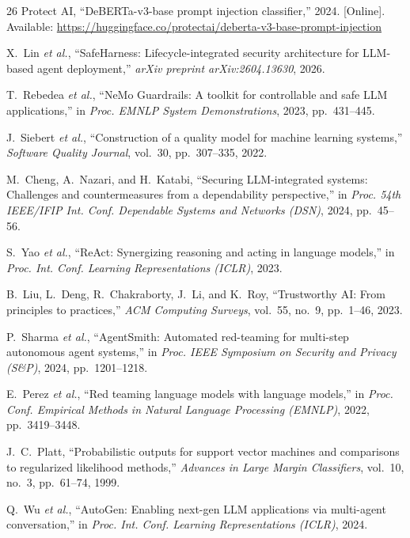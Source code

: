 \documentclass[conference]{IEEEtran}
\begin{document}
\begin{thebibliography}{26}
Protect AI, ``DeBERTa-v3-base prompt injection classifier,'' 2024. [Online]. Available: \url{https://huggingface.co/protectai/deberta-v3-base-prompt-injection}

X.~Lin \textit{et al.}, ``SafeHarness: Lifecycle-integrated security architecture for LLM-based agent deployment,'' \textit{arXiv preprint arXiv:2604.13630}, 2026.

T.~Rebedea \textit{et al.}, ``NeMo Guardrails: A toolkit for controllable and safe LLM applications,'' in \textit{Proc. EMNLP System Demonstrations}, 2023, pp.~431--445.

J.~Siebert \textit{et al.}, ``Construction of a quality model for machine learning systems,'' \textit{Software Quality Journal}, vol.~30, pp.~307--335, 2022.

M.~Cheng, A.~Nazari, and H.~Katabi, ``Securing LLM-integrated systems: Challenges and countermeasures from a dependability perspective,'' in \textit{Proc. 54th IEEE/IFIP Int. Conf. Dependable Systems and Networks (DSN)}, 2024, pp.~45--56.

S.~Yao \textit{et al.}, ``ReAct: Synergizing reasoning and acting in language models,'' in \textit{Proc. Int. Conf. Learning Representations (ICLR)}, 2023.

B.~Liu, L.~Deng, R.~Chakraborty, J.~Li, and K.~Roy, ``Trustworthy AI: From principles to practices,'' \textit{ACM Computing Surveys}, vol.~55, no.~9, pp.~1--46, 2023.

P.~Sharma \textit{et al.}, ``AgentSmith: Automated red-teaming for multi-step autonomous agent systems,'' in \textit{Proc. IEEE Symposium on Security and Privacy (S\&P)}, 2024, pp.~1201--1218.

E.~Perez \textit{et al.}, ``Red teaming language models with language models,'' in \textit{Proc. Conf. Empirical Methods in Natural Language Processing (EMNLP)}, 2022, pp.~3419--3448.

J.~C.~Platt, ``Probabilistic outputs for support vector machines and comparisons to regularized likelihood methods,'' \textit{Advances in Large Margin Classifiers}, vol.~10, no.~3, pp.~61--74, 1999.

Q.~Wu \textit{et al.}, ``AutoGen: Enabling next-gen LLM applications via multi-agent conversation,'' in \textit{Proc. Int. Conf. Learning Representations (ICLR)}, 2024.


\end{thebibliography}
\end{document}
